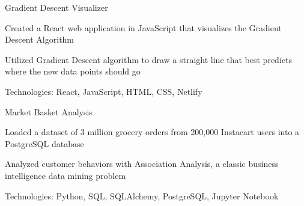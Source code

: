 
\begin{cventries}
  \cventry
    {} %
    {Gradient Descent Visualizer} %
    {} %
    {} %
    {
      \begin{cvitems} %
        \item {Created a React web application in JavaScript that visualizes the Gradient Descent Algorithm}
		\item {Utilized Gradient Descent algorithm to draw a straight line that best predicts where the new data points should go}
		\item {Technologies: React, JavaScript, HTML, CSS, Netlify}
      \end{cvitems}
    }

  \cventry
    {} %
    {Market Basket Analysis} %
    {} %
    {} %
    {
      \begin{cvitems} %
        \item {Loaded a dataset of 3 million grocery orders from 200,000 Instacart users into a PostgreSQL database}
		\item {Analyzed customer behaviors with Association Analysis, a classic business intelligence data mining problem}
		\item {Technologies: Python, SQL, SQLAlchemy, PostgreSQL, Jupyter Notebook}
      \end{cvitems}
    }
\end{cventries}